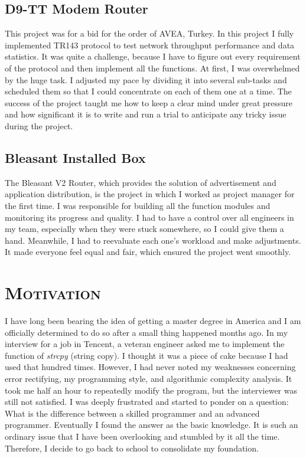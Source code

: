 \documentclass{article}
\begin{document}
\begin{multicols}{2}
		\subsection{D9-TT Modem Router}
		This project was for a bid for the order of AVEA, Turkey. In this project I fully implemented TR143 protocol to test network throughput performance and data statistics. It was quite a challenge, because I have to figure out every requirement of the protocol and then implement all the functions. At first, I was overwhelmed by the huge task. I adjusted my pace by dividing it into several sub-tasks and scheduled them so that I could concentrate on each of them one at a time. The success of the project taught me how to keep a clear mind under great pressure and how significant it is to write and run a trial to anticipate any tricky issue during the project.
		\subsection{Bleasant Installed Box}
		The Bleasant V2 Router, which provides the solution of advertisement and application distribution, is the project in which I worked as project manager for the first time. I was responsible for building all the function modules and monitoring its progress and quality. I had to have a control over all engineers in my team, especially when they were stuck somewhere, so I could give them a hand. Meanwhile, I had to reevaluate each one’s workload and make adjustments. It made everyone feel equal and fair, which ensured the project went smoothly.
		\section{\textsc{Motivation}}
		I have long been bearing the idea of getting a master degree in America and I am officially determined to do so after a small thing happened months ago. In my interview for a job in Tencent, a veteran engineer asked me to implement the function of \textit{strcpy} (string copy). I thought it was a piece of cake because I had used that hundred times. However, I had never noted my weaknesses concerning error rectifying, my programming style, and algorithmic complexity analysis. It took me half an hour to repeatedly modify the program, but the interviewer was still not satisfied. I was deeply frustrated and started to ponder on a question: What is the difference between a skilled programmer and an advanced programmer. Eventually I found the answer as the basic knowledge. It is such an ordinary issue that I have been overlooking and stumbled by it all the time. Therefore, I decide to go back to school to consolidate my foundation.

\end{multicols}
\end{document}
